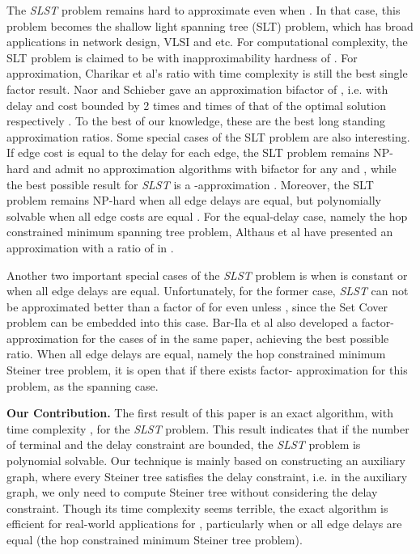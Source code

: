 \documentclass[english,runningheads,a4paper]{llncs}
\begin{document}
The \emph{SLST }problem remains hard to approximate even when .
In that case, this problem becomes the shallow light spanning tree
(SLT) problem, which has broad applications in network design, VLSI
and etc. For computational complexity, the SLT problem is claimed
to be with inapproximability hardness of  \cite{naor1997improved}.
For approximation, Charikar et al's  ratio with time
complexity \cite{charikar1998approximation} is still
the best single factor result. Naor and Schieber gave an approximation
bifactor of , i.e. with delay and cost bounded
by 2 times and  times of that of the optimal solution
respectively \cite{naor1997improved}. To the best of our knowledge,
these are the best long standing approximation ratios. Some special
cases of the SLT problem are also interesting. If edge cost is equal
to the delay for each edge, the SLT problem remains NP-hard and admit
no approximation algorithms with bifactor  for
any  and  \cite{khuller1995balancing},
while the best possible result for \emph{SLST} is a -approximation
\cite{elkin2011steiner}.  Moreover, the SLT problem remains NP-hard
when all edge delays are equal, but polynomially solvable when all
edge costs are equal \cite{salama1997delay}. For the equal-delay
case, namely the hop constrained minimum spanning tree problem, Althaus
et al have presented an approximation with a ratio of 
in \cite{althaus2005approximating}.

Another two important special cases of the \emph{SLST} problem is
when  is constant or when all edge delays are equal. Unfortunately,
for the former case, \emph{SLST} can not be approximated better than
a factor of  for even  unless 
\cite{bar2001generalized}, since the Set Cover problem can be embedded
into this case. Bar-Ila et al also developed a factor-
approximation for the cases of  in the same paper, achieving
the best possible ratio. When all edge delays are equal, namely the
hop constrained minimum Steiner tree problem, it is open that if there
exists factor- approximation for this problem,
as the spanning case.

\textbf{Our Contribution. }The first result of this paper is an exact
algorithm, with time complexity ,
for the \emph{SLST} problem. This result indicates that if the number
of terminal and the delay constraint are bounded, the \emph{SLST}
problem is polynomial solvable. Our technique is mainly based on constructing
an auxiliary graph, where every Steiner tree satisfies the delay constraint,
i.e. in the auxiliary graph, we only need to compute Steiner tree
without considering the delay constraint. Though its time complexity
seems terrible, the exact algorithm is efficient for real-world applications
for , particularly when  or all edge delays are
equal (the hop constrained minimum Steiner tree problem).
\end{document}
